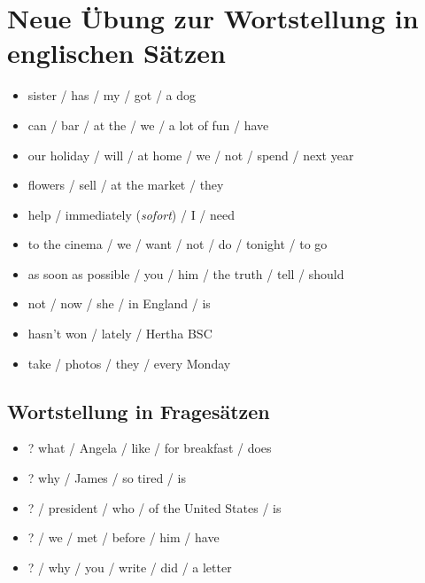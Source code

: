\documentclass[a4paper,11pt]{scrreprt}
\begin{document}
\chapter*{Neue Übung zur Wortstellung in englischen Sätzen}


\begin{itemize}

  \item sister / has / my / got / a dog
  
  \item can / bar / at the / we / a lot of fun / have
  
  \item our holiday / will / at home / we / not / spend / next year
  
  \item flowers / sell / at the market / they
  
  \item help / immediately (\textit{sofort}) / I / need
  
  \item to the cinema / we / want / not / do / tonight / to go
  
  \item as soon as possible / you / him / the truth / tell / should
  
  \item not / now / she / in England / is
  
  \item hasn't won / lately / Hertha BSC
  
  \item take / photos / they / every Monday
    
\end{itemize}


\section*{Wortstellung in Fragesätzen}


\begin{itemize}

	\item ? what / Angela / like / for breakfast / does
	
	\item ? why / James / so tired / is
	
	\item ? / president / who / of the United States / is
	
	\item ? / we / met / before / him / have
	
	\item ? / why / you / write / did / a letter
	
\end{itemize}
\end{document}
